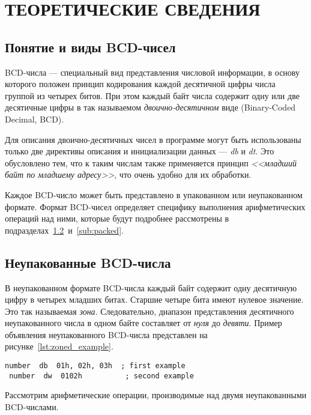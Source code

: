 \section{ТЕОРЕТИЧЕСКИЕ СВЕДЕНИЯ}

\subsection{Понятие и виды BCD-чисел}

BCD-числа --- специальный вид представления числовой информации, в основу которого
положен принцип кодирования каждой десятичной цифры числа группой из четырех битов.
При этом каждый байт числа содержит одну или две десятичные цифры в так называемом
\textit{двоично-десятичном} виде (Binary-Coded Decimal, BCD).

Для описания двоично-десятичных чисел в программе могут быть использованы только
две директивы описания и инициализации данных --- \textit{db} и \textit{dt}.
Это обусловлено тем, что к таким числам также применяется принцип
\textit{<<младший байт по младшему адресу>>}, что очень удобно для их обработки.

Каждое BCD-число может быть представлено в упакованном или неупакованном формате.
Формат BCD-чисел определяет специфику выполнения арифметических операций над ними,
которые будут подробнее рассмотрены в подразделах~\ref{sub:zoned}~и~\ref{sub:packed}.


\subsection{Неупакованные BCD-числа}
\label{sub:zoned}

В неупакованном формате BCD-числа каждый байт содержит одну десятичную цифру в
четырех младших битах. Старшие четыре бита имеют нулевое значение. Это так называемая
\textit{зона}. Следовательно, диапазон представления десятичного неупакованного
числа в одном байте составляет от \textit{нуля} до \textit{девяти}. Пример объявления
неупакованного BCD-числа представлен на рисунке~\ref{lst:zoned_example}.

\begin{lstlisting}[caption=Пример объявления неупакованного BCD-числа,label=lst:zoned_example,
language={[x86masm]Assembler}]
 number  db  01h, 02h, 03h  ; first example
 number  dw  0102h          ; second example
\end{lstlisting}

Рассмотрим арифметические операции, производимые над двумя неупакованными BCD-числами.

